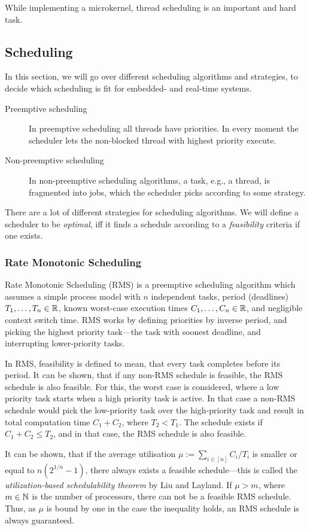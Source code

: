 While implementing a microkernel, thread scheduling is an important and hard task.

\subsection{Scheduling}
In this section, we will go over different scheduling algorithms and strategies, to decide which scheduling is fit for embedded- and real-time systems.
\begin{description}
    \item[Preemptive scheduling] In preemptive scheduling all threads have priorities.
        In every moment the scheduler lets the non-blocked thread with highest priority execute.

    \item[Non-preemptive scheduling] In non-preemptive scheduling algorithms, a task, e.g., a thread, is fragmented into jobs, which the scheduler picks according to some strategy.
\end{description}
There are a lot of different strategies for scheduling algorithms.
We will define a scheduler to be \emph{optimal}, iff it finds a schedule according to a \emph{feasibility} criteria if one exists.

\subsubsection{Rate Monotonic Scheduling}
Rate Monotonic Scheduling (RMS) is a preemptive scheduling algorithm which assumes a simple process model with \(n\) independent tasks, period (deadlines) \(T_1, \dots, T_n \in \mathbb R\), known worst-case execution times \(C_1, \dots, C_n \in \mathbb R\), and negligible context switch time.
RMS works by defining priorities by inverse period, and picking the highest priority task---the task with soonest deadline, and interrupting lower-priority tasks.

In RMS, feasibility is defined to mean, that every task completes before its period.
It can be shown, that if any non-RMS schedule is feasible, the RMS schedule is also feasible.
For this, the worst case is considered, where a low priority task starts when a high priority task is active.
In that case a non-RMS schedule would pick the low-priority task over the high-priority task and result in total computation time \(C_1 + C_2\), where \(T_2 < T_1\).
The schedule exists if \(C_1 + C_2 \le T_2\), and in that case, the RMS schedule is also feasible.

It can be shown, that if the average utilisation \(\mu := \sum_{i \in [n]}C_i/T_i\) is smaller or equal to \(n(2^{1/n} - 1)\), there always exists a feasible schedule---this is called the \emph{utilization-based schedulability theorem} by Liu and Layland.
If \(\mu > m\), where \(m \in \mathbb N\) is the number of processors, there can not be a feasible RMS schedule.
Thus, as \(\mu\) is bound by one in the case the inequality holds, an RMS schedule is always guaranteed.

